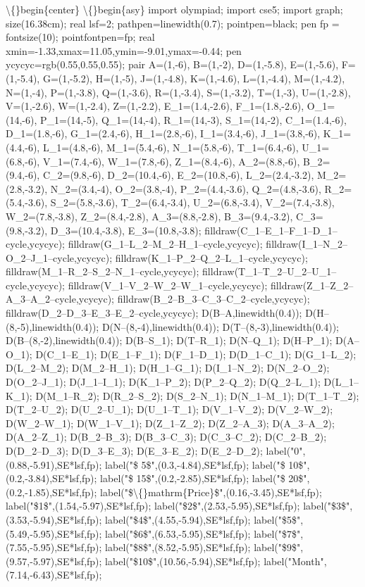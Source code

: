 \documentclass{article}
\begin{document}
\begin{enumerate}[label=\arabic*., itemsep=0.5em]
\textbackslash\{\}begin\{center\}
\textbackslash\{\}begin\{asy\}
import olympiad;
import cse5;
import graph; size(16.38cm); real lsf=2; pathpen=linewidth(0.7); pointpen=black; pen fp = fontsize(10); pointfontpen=fp; real xmin=-1.33,xmax=11.05,ymin=-9.01,ymax=-0.44;
pen ycycyc=rgb(0.55,0.55,0.55);
pair A=(1,-6), B=(1,-2), D=(1,-5.8), E=(1,-5.6), F=(1,-5.4), G=(1,-5.2), H=(1,-5), J=(1,-4.8), K=(1,-4.6), L=(1,-4.4), M=(1,-4.2), N=(1,-4), P=(1,-3.8), Q=(1,-3.6), R=(1,-3.4), S=(1,-3.2), T=(1,-3), U=(1,-2.8), V=(1,-2.6), W=(1,-2.4), Z=(1,-2.2), E\_1=(1.4,-2.6), F\_1=(1.8,-2.6), O\_1=(14,-6), P\_1=(14,-5), Q\_1=(14,-4), R\_1=(14,-3), S\_1=(14,-2), C\_1=(1.4,-6), D\_1=(1.8,-6), G\_1=(2.4,-6), H\_1=(2.8,-6), I\_1=(3.4,-6), J\_1=(3.8,-6), K\_1=(4.4,-6), L\_1=(4.8,-6), M\_1=(5.4,-6), N\_1=(5.8,-6), T\_1=(6.4,-6), U\_1=(6.8,-6), V\_1=(7.4,-6), W\_1=(7.8,-6), Z\_1=(8.4,-6), A\_2=(8.8,-6), B\_2=(9.4,-6), C\_2=(9.8,-6), D\_2=(10.4,-6), E\_2=(10.8,-6), L\_2=(2.4,-3.2), M\_2=(2.8,-3.2), N\_2=(3.4,-4), O\_2=(3.8,-4), P\_2=(4.4,-3.6), Q\_2=(4.8,-3.6), R\_2=(5.4,-3.6), S\_2=(5.8,-3.6), T\_2=(6.4,-3.4), U\_2=(6.8,-3.4), V\_2=(7.4,-3.8), W\_2=(7.8,-3.8), Z\_2=(8.4,-2.8), A\_3=(8.8,-2.8), B\_3=(9.4,-3.2), C\_3=(9.8,-3.2), D\_3=(10.4,-3.8), E\_3=(10.8,-3.8);
filldraw(C\_1--E\_1--F\_1--D\_1--cycle,ycycyc); filldraw(G\_1--L\_2--M\_2--H\_1--cycle,ycycyc); filldraw(I\_1--N\_2--O\_2--J\_1--cycle,ycycyc); filldraw(K\_1--P\_2--Q\_2--L\_1--cycle,ycycyc); filldraw(M\_1--R\_2--S\_2--N\_1--cycle,ycycyc); filldraw(T\_1--T\_2--U\_2--U\_1--cycle,ycycyc); filldraw(V\_1--V\_2--W\_2--W\_1--cycle,ycycyc); filldraw(Z\_1--Z\_2--A\_3--A\_2--cycle,ycycyc); filldraw(B\_2--B\_3--C\_3--C\_2--cycle,ycycyc); filldraw(D\_2--D\_3--E\_3--E\_2--cycle,ycycyc); D(B--A,linewidth(0.4)); D(H--(8,-5),linewidth(0.4)); D(N--(8,-4),linewidth(0.4)); D(T--(8,-3),linewidth(0.4)); D(B--(8,-2),linewidth(0.4)); D(B--S\_1); D(T--R\_1); D(N--Q\_1); D(H--P\_1); D(A--O\_1); D(C\_1--E\_1); D(E\_1--F\_1); D(F\_1--D\_1); D(D\_1--C\_1); D(G\_1--L\_2); D(L\_2--M\_2); D(M\_2--H\_1); D(H\_1--G\_1); D(I\_1--N\_2); D(N\_2--O\_2); D(O\_2--J\_1); D(J\_1--I\_1); D(K\_1--P\_2); D(P\_2--Q\_2); D(Q\_2--L\_1); D(L\_1--K\_1); D(M\_1--R\_2); D(R\_2--S\_2); D(S\_2--N\_1); D(N\_1--M\_1); D(T\_1--T\_2); D(T\_2--U\_2); D(U\_2--U\_1); D(U\_1--T\_1); D(V\_1--V\_2); D(V\_2--W\_2); D(W\_2--W\_1); D(W\_1--V\_1); D(Z\_1--Z\_2); D(Z\_2--A\_3); D(A\_3--A\_2); D(A\_2--Z\_1); D(B\_2--B\_3); D(B\_3--C\_3); D(C\_3--C\_2); D(C\_2--B\_2); D(D\_2--D\_3); D(D\_3--E\_3); D(E\_3--E\_2); D(E\_2--D\_2); label("0",(0.88,-5.91),SE*lsf,fp); label("\$ 5\$",(0.3,-4.84),SE*lsf,fp); label("\$ 10\$",(0.2,-3.84),SE*lsf,fp); label("\$ 15\$",(0.2,-2.85),SE*lsf,fp); label("\$ 20\$",(0.2,-1.85),SE*lsf,fp); label("\$\textbackslash\{\}mathrm\{Price\}\$",(0.16,-3.45),SE*lsf,fp); label("\$1\$",(1.54,-5.97),SE*lsf,fp); label("\$2\$",(2.53,-5.95),SE*lsf,fp); label("\$3\$",(3.53,-5.94),SE*lsf,fp); label("\$4\$",(4.55,-5.94),SE*lsf,fp); label("\$5\$",(5.49,-5.95),SE*lsf,fp); label("\$6\$",(6.53,-5.95),SE*lsf,fp); label("\$7\$",(7.55,-5.95),SE*lsf,fp); label("\$8\$",(8.52,-5.95),SE*lsf,fp); label("\$9\$",(9.57,-5.97),SE*lsf,fp); label("\$10\$",(10.56,-5.94),SE*lsf,fp); label("Month",(7.14,-6.43),SE*lsf,fp);

\end{enumerate}
\end{document}
